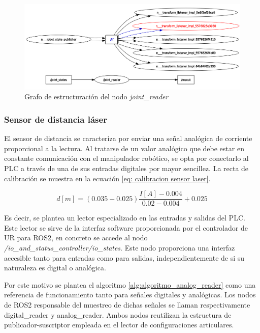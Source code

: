 \begin{figure}[h!]
    \centering
    \includegraphics[scale=0.15]{figuras/nodo joint_reader rqt_graph.png}
    \caption{Grafo de estructuración del nodo \textit{joint\_reader}}
    \label{fig:nodo joint_reader rqt_graph}
\end{figure}


\subsubsection*{Sensor de distancia láser}
\hypertarget{Sensor de distancia láser}{}

El sensor de distancia se caracteriza por enviar una señal analógica de corriente proporcional a la lectura. Al tratarse de un valor analógico que debe estar en constante comunicación con el manipulador robótico, se opta por conectarlo al \acrshort{PLC} a través de una de sus entradas digitales por mayor sencillez. La recta de calibración se muestra en la ecuación \ref{eq: calibracion sensor laser}.

\begin{equation}
\label{eq: calibracion sensor laser}
    d [m]=(0.035-0.025) \frac{I[A]-0.004}{0.02-0.004}+0.025 
\end{equation}

Es decir, se plantea un lector especializado en las entradas y salidas del \acrshort{PLC}. Este lector se sirve de la interfaz software proporcionada por el controlador de UR para ROS2, en concreto se accede al nodo \textit{/io\_and\_status\_controller/io\_states}. Este nodo proporciona una interfaz accesible tanto para entradas como para salidas, independientemente de si su naturaleza es digital o analógica. 

Por este motivo se plantea el algoritmo \ref{alg:algoritmo_analog_reader} como una referencia de funcionamiento tanto para señales digitales y analógicas. Los nodos de ROS2 responsable del muestreo de dichas señales se llaman respectivamente digital\_reader y analog\_reader. Ambos nodos reutilizan la estructura de publicador-suscriptor empleada en el lector de configuraciones articulares.

